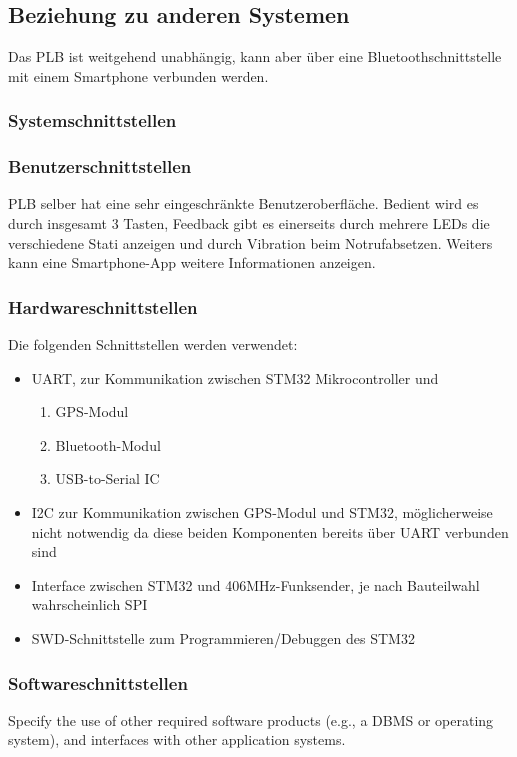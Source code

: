 \subsection{Beziehung zu anderen Systemen}
Das PLB ist weitgehend unabhängig, kann aber über eine Bluetoothschnittstelle mit einem Smartphone verbunden werden.

\subsubsection{Systemschnittstellen}


\subsubsection{Benutzerschnittstellen}
PLB selber hat eine sehr eingeschränkte Benutzeroberfläche. Bedient wird es durch insgesamt 3 Tasten, Feedback gibt es einerseits durch mehrere LEDs die verschiedene Stati anzeigen und durch Vibration beim Notrufabsetzen. Weiters kann eine Smartphone-App weitere Informationen anzeigen. \\[-0.3cm]

\subsubsection{Hardwareschnittstellen}
Die folgenden Schnittstellen werden verwendet:
\begin{itemize}
\item UART, zur Kommunikation zwischen STM32 Mikrocontroller und 
	\begin{enumerate}
	\item GPS-Modul
	\item Bluetooth-Modul 
	\item USB-to-Serial IC 
\end{enumerate}
\item I2C zur Kommunikation zwischen GPS-Modul und STM32, möglicherweise nicht notwendig da diese beiden Komponenten bereits über UART verbunden sind
\item Interface zwischen STM32 und 406MHz-Funksender, je nach Bauteilwahl wahrscheinlich SPI
\item SWD-Schnittstelle zum Programmieren/Debuggen des STM32
\end{itemize}


\subsubsection{Softwareschnittstellen}
Specify the use of other required software products (e.g., a DBMS or operating system), and interfaces with other application systems. \\[-0.3cm]

